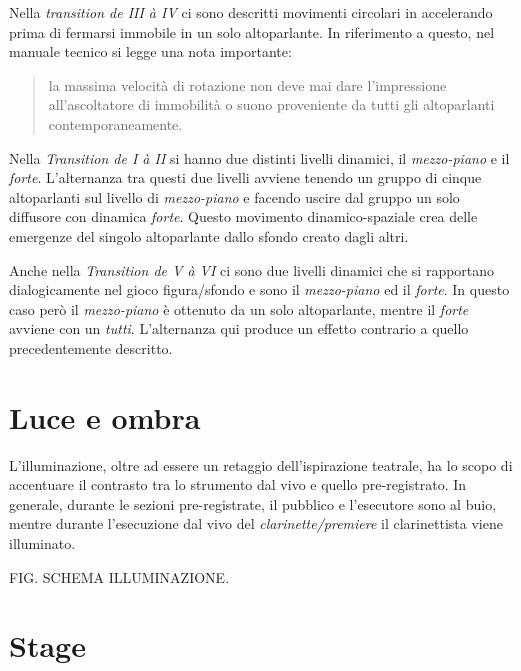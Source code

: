 \begin{table*}[h]
\begin{center}
\begin{tabular}{c c c c c}
\end{tabular}
\end{center}
\label{tab:diffiv-v}

\end{table*}

Nella \emph{transition de III à IV} ci sono descritti movimenti circolari in accelerando prima di fermarsi immobile in un solo altoparlante. In riferimento a questo, nel manuale tecnico si legge una nota importante:

\begin{quote}
{\small la massima velocità di rotazione non deve mai dare l'impressione all'ascoltatore di immobilità o suono proveniente da tutti gli altoparlanti contemporaneamente.
}
\end{quote}

Nella \emph{Transition de I à II} si hanno due distinti livelli dinamici, il \emph{mezzo-piano} e il \emph{forte}. L'alternanza tra questi due livelli avviene tenendo un gruppo di cinque altoparlanti sul livello di \emph{mezzo-piano} e facendo uscire dal gruppo un solo diffusore con dinamica \emph{forte}. Questo movimento dinamico-spaziale crea delle emergenze del singolo altoparlante dallo sfondo creato dagli altri.

Anche nella \emph{Transition de V à VI} ci sono due livelli dinamici che si rapportano dialogicamente nel gioco figura/sfondo e sono il \emph{mezzo-piano} ed il \emph{forte}. In questo caso però il \emph{mezzo-piano} è ottenuto da un solo altoparlante, mentre il \emph{forte} avviene con un \emph{tutti}. L'alternanza qui produce un effetto contrario a quello precedentemente descritto.

\section{Luce e ombra}

L'illuminazione, oltre ad essere un retaggio dell'ispirazione teatrale, ha lo scopo di accentuare il contrasto tra lo strumento dal vivo e quello pre-registrato. In generale, durante le sezioni pre-registrate, il pubblico e l'esecutore sono al buio, mentre durante l'esecuzione dal vivo del \emph{clarinette/premiere} il clarinettista viene illuminato.

FIG. SCHEMA ILLUMINAZIONE.

\section{Stage}

